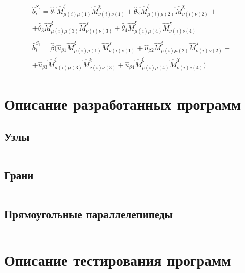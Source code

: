 \documentclass[12pt, a4paper]{article}
\begin{document}
\begin{align}
  \begin{split}
    \hat{b}_i^{S_2} 
      = \hat{\theta}_1 \hat{M}_{\mu(i)\mu(1)}^{\xi} \hat{M}_{\nu(i)\nu(1)}^{\chi} + 
        \hat{\theta}_2 \hat{M}_{\mu(i)\mu(2)}^{\xi} \hat{M}_{\nu(i)\nu(2)}^{\chi} + \\
      + \hat{\theta}_3 \hat{M}_{\mu(i)\mu(3)}^{\xi} \hat{M}_{\nu(i)\nu(3)}^{\chi} +
        \hat{\theta}_4 \hat{M}_{\mu(i)\mu(4)}^{\xi} \hat{M}_{\nu(i)\nu(4)}^{\chi}
  \end{split} \\[1ex]
  \begin{split}
    \hat{b}_i^{S_3} 
      = \hat{\beta}(
        \hat{u}_{\beta 1} \hat{M}_{\mu(i)\mu(1)}^{\xi} \hat{M}_{\nu(i)\nu(1)}^{\chi} + 
        \hat{u}_{\beta 2} \hat{M}_{\mu(i)\mu(2)}^{\xi} \hat{M}_{\nu(i)\nu(2)}^{\chi} + \\
      + \hat{u}_{\beta 3} \hat{M}_{\mu(i)\mu(3)}^{\xi} \hat{M}_{\nu(i)\nu(3)}^{\chi} +
        \hat{u}_{\beta 4} \hat{M}_{\mu(i)\mu(4)}^{\xi} \hat{M}_{\nu(i)\nu(4)}^{\chi}
      )
  \end{split}
\end{align}

\section{Описание разработанных программ}
\subsection{Узлы}
\inputminted[firstline=4, lastline=13]{c}{/home/mehandes/c/src/github.com/paraskun/math/pde/fem/sse/include/fem/sse/vtx.h}

\subsection{Грани}
\inputminted[firstline=8, lastline=52]{c}{/home/mehandes/c/src/github.com/paraskun/math/pde/fem/sse/include/fem/sse/fce.h}

\subsection{Прямоугольные параллелепипеды}
\inputminted[firstline=9, lastline=33]{c}{/home/mehandes/c/src/github.com/paraskun/math/pde/fem/sse/include/fem/sse/hex.h}

\section{Описание тестирования программ}
\end{document}

